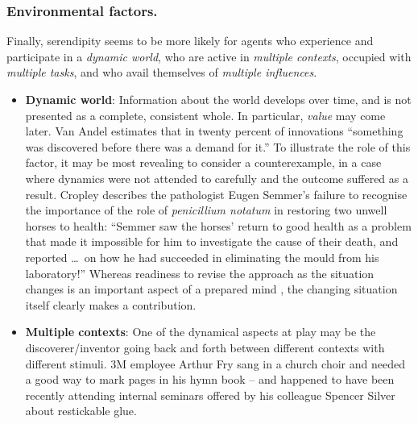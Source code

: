 \subsubsection{Environmental factors.}

Finally, serendipity seems to be more likely for agents who experience and participate in a \emph{dynamic world}, who are active in \emph{multiple contexts}, occupied with \emph{multiple tasks}, and who avail themselves of \emph{multiple influences}.

\begin{itemize}
\item \textbf{Dynamic world}: Information about the world develops
  over time, and is not presented as a complete, consistent whole.  In
  particular, \emph{value} may come later.  Van Andel
  \citeyear[p. 643]{van1994anatomy} estimates that in twenty percent
  of innovations ``something was discovered before there was a demand
  for it.''  To illustrate the role of this factor, it may be most
  revealing to consider a counterexample, in a case where dynamics
  were not attended to carefully and the outcome suffered as a result.
  Cropley \citeyear{cropley2006praise} describes the pathologist Eugen
  Semmer's failure to recognise the importance of the role of
  \emph{penicillium notatum} in restoring two unwell horses to health:
  ``Semmer saw the horses' return to good health as a problem that
  made it impossible for him to investigate the cause of their death,
  and reported \ldots\ on how he had succeeded in eliminating the
  mould from his laboratory!''  Whereas readiness to revise the
  approach as the situation changes is an important aspect of a prepared
  mind \cite{bereiter1997situated}, the changing situation itself
  clearly makes a contribution.
\end{itemize}

\begin{itemize}
\item \textbf{Multiple contexts}: One of the dynamical aspects at play
  may be the discoverer/inventor going back and forth between
  different contexts with different stimuli.  3M employee Arthur Fry
  sang in a church choir and needed a good way to mark pages in his
  hymn book -- and happened to have been recently attending internal
  seminars offered by his colleague Spencer Silver about restickable
  glue.
\end{itemize}

